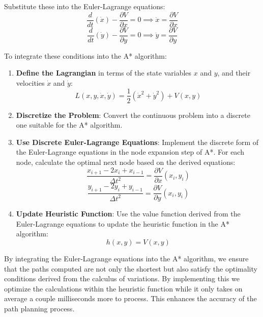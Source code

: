 \documentclass[12pt]{article}
\begin{document}
Substitute these into the Euler-Lagrange equations:
\begin{equation}
    \frac{d}{dt} \left( \dot{x} \right) - \frac{\partial V}{\partial x} = 0 \implies \ddot{x} = \frac{\partial V}{\partial x}
\end{equation}
\begin{equation}
    \frac{d}{dt} \left( \dot{y} \right) - \frac{\partial V}{\partial y} = 0 \implies \ddot{y} = \frac{\partial V}{\partial y}
\end{equation}



To integrate these conditions into the A* algorithm:

\begin{enumerate}
    \item \textbf{Define the Lagrangian} in terms of the state variables \( x \) and \( y \), and their velocities \( \dot{x} \) and \( \dot{y} \):
    \begin{equation}
        L(x, y, \dot{x}, \dot{y}) = \frac{1}{2} (\dot{x}^2 + \dot{y}^2) + V(x, y)
    \end{equation}
    \item \textbf{Discretize the Problem}: Convert the continuous problem into a discrete one suitable for the A* algorithm.
    \item \textbf{Use Discrete Euler-Lagrange Equations}: Implement the discrete form of the Euler-Lagrange equations in the node expansion step of A*. For each node, calculate the optimal next node based on the derived equations:
    \begin{equation}
        \frac{x_{i+1} - 2x_i + x_{i-1}}{\Delta t^2} = \frac{\partial V}{\partial x}(x_i, y_i)
    \end{equation}
    \begin{equation}
        \frac{y_{i+1} - 2y_i + y_{i-1}}{\Delta t^2} = \frac{\partial V}{\partial y}(x_i, y_i)
    \end{equation}
    \item \textbf{Update Heuristic Function}: Use the value function derived from the Euler-Lagrange equations to update the heuristic function in the A* algorithm:
    \begin{equation}
        h(x, y) = V(x, y)
    \end{equation}
\end{enumerate}



By integrating the Euler-Lagrange equations into the A* algorithm, we ensure that the paths computed are not only the shortest but also satisfy the optimality conditions derived from the calculus of variations. By implementing this we optimize the calculations within the heuristic function while it only takes on average a couple milliseconds more to process. This enhances the accuracy of the path planning process.
\newpage
\end{document}
